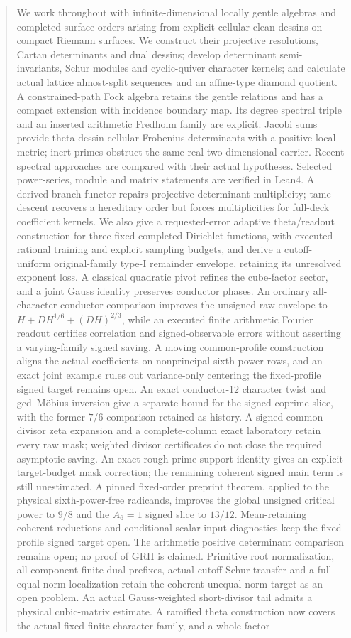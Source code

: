 \begin{abstract}
We work throughout with infinite-dimensional locally gentle algebras and completed surface orders arising from explicit cellular clean dessins on compact Riemann surfaces. We construct their projective resolutions, Cartan determinants and dual dessins; develop determinant semi-invariants, Schur modules and cyclic-quiver character kernels; and calculate actual lattice almost-split sequences and an affine-type diamond quotient. A constrained-path Fock algebra retains the gentle relations and has a compact extension with incidence boundary map. Its degree spectral triple and an inserted arithmetic Fredholm family are explicit. Jacobi sums provide theta-dessin cellular Frobenius determinants with a positive local metric; inert primes obstruct the same real two-dimensional carrier. Recent spectral approaches are compared with their actual hypotheses. Selected power-series, module and matrix statements are verified in Lean4. A derived branch functor repairs projective determinant multiplicity; tame descent recovers a hereditary order but forces multiplicities for full-deck coefficient kernels. We also give a requested-error adaptive theta/readout construction for three fixed completed Dirichlet functions, with executed rational training and explicit sampling budgets, and derive a cutoff-uniform original-family type-I remainder envelope, retaining its unresolved exponent loss. A classical quadratic pivot refines the cube-factor sector, and a joint Gauss identity preserves conductor phases. An ordinary all-character conductor comparison improves the unsigned raw envelope to $H+DH^{1/6}+(DH)^{2/3}$, while an executed finite arithmetic Fourier readout certifies correlation and signed-observable errors without asserting a varying-family signed saving. A moving common-profile construction aligns the actual coefficients on nonprincipal sixth-power rows, and an exact joint example rules out variance-only centering; the fixed-profile signed target remains open. An exact conductor-12 character twist and gcd--M\"obius inversion give a separate bound for the signed coprime slice, with the former $7/6$ comparison retained as history. A signed common-divisor zeta expansion and a complete-column exact laboratory retain every raw mask; weighted divisor certificates do not close the required asymptotic saving. An exact rough-prime support identity gives an explicit target-budget mask correction; the remaining coherent signed main term is still unestimated. A pinned fixed-order preprint theorem, applied to the physical sixth-power-free radicands, improves the global unsigned critical power to $9/8$ and the $A_6=1$ signed slice to $13/12$. Mean-retaining coherent reductions and conditional scalar-input diagnostics keep the fixed-profile signed target open. The arithmetic positive determinant comparison remains open; no proof of GRH is claimed. Primitive root normalization, all-component finite dual prefixes, actual-cutoff Schur transfer and a full equal-norm localization retain the coherent unequal-norm target as an open problem. An actual Gauss-weighted short-divisor tail admits a physical cubic-matrix estimate. A ramified theta construction now covers the actual fixed finite-character family, and a whole-factor 
\end{abstract}

